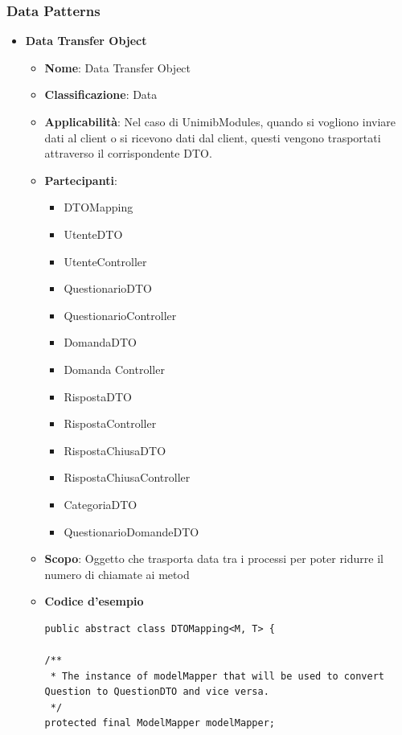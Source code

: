 \documentclass[12pt]{article}
\begin{document}
\subsubsection{Data Patterns}
	\begin{itemize}
		\item \textbf{Data Transfer Object}
		\begin{itemize}
		\item \textbf{Nome}: Data Transfer Object
            \item \textbf{Classificazione}: Data
            \item \textbf{Applicabilità}: Nel caso di UnimibModules, quando si vogliono inviare dati al client o si ricevono dati dal client, questi vengono trasportati attraverso il corrispondente DTO.
            \item \textbf{Partecipanti}:
                \begin{itemize}
                    \item DTOMapping
                    \item UtenteDTO
                    \item UtenteController
                    \item QuestionarioDTO
                    \item QuestionarioController
                    \item DomandaDTO
                    \item Domanda Controller
                    \item RispostaDTO
                    \item RispostaController
                    \item RispostaChiusaDTO
                    \item RispostaChiusaController
                    \item CategoriaDTO
                    \item QuestionarioDomandeDTO
                \end{itemize}
            \item \textbf{Scopo}: Oggetto che trasporta data tra i processi per poter ridurre il numero di chiamate ai metod
            \item \textbf{Codice d'esempio}
            \begin{lstlisting}
public abstract class DTOMapping<M, T> {

/**
 * The instance of modelMapper that will be used to convert Question to QuestionDTO and vice versa.
 */
protected final ModelMapper modelMapper;


\end{lstlisting}
\end{itemize}
\end{itemize}
\end{document}
